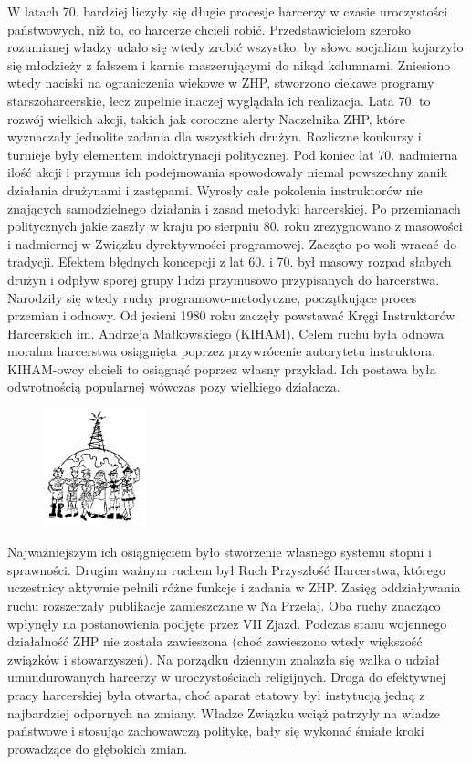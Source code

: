 W latach 70. bardziej liczyły się długie procesje harcerzy w czasie uroczystości państwowych, niż to, co harcerze chcieli robić. Przedstawicielom szeroko rozumianej władzy udało się wtedy zrobić wszystko, by słowo socjalizm kojarzyło się młodzieży z fałszem i karnie maszerującymi do nikąd kolumnami. Zniesiono wtedy naciski na ograniczenia wiekowe w ZHP, stworzono ciekawe programy starszoharcerskie, lecz zupełnie inaczej wyglądała ich realizacja. Lata 70. to rozwój wielkich akcji, takich jak coroczne alerty Naczelnika ZHP, które wyznaczały jednolite zadania dla wszystkich drużyn. Rozliczne konkursy i turnieje były elementem indoktrynacji politycznej. Pod koniec lat 70. nadmierna ilość akcji i przymus ich podejmowania spowodowały niemal powszechny zanik działania drużynami i zastępami. Wyrosły całe pokolenia instruktorów nie znających samodzielnego działania i zasad metodyki harcerskiej.
Po przemianach politycznych jakie zaszły w kraju po sierpniu 80. roku zrezygnowano z masowości i nadmiernej w Związku dyrektywności programowej. Zaczęto po woli wracać do tradycji. Efektem błędnych koncepcji z lat 60. i 70. był masowy rozpad słabych drużyn i odpływ sporej grupy ludzi przymusowo przypisanych do harcerstwa. 
Narodziły się wtedy ruchy programowo-metodyczne, początkujące proces przemian i odnowy. Od jesieni 1980 roku zaczęły powstawać Kręgi Instruktorów Harcerskich im. Andrzeja Małkowskiego (KIHAM). Celem ruchu była odnowa moralna harcerstwa osiągnięta poprzez przywrócenie autorytetu instruktora. KIHAM-owcy chcieli to osiągnąć poprzez własny przykład. Ich postawa była odwrotnością popularnej wówczas pozy wielkiego działacza. \begin{figure}
  \begin{center}
    \includegraphics[width=3cm]{grafiki/bts.png}
  \end{center}
\end{figure}Najważniejszym ich osiągnięciem było stworzenie własnego systemu stopni i sprawności. Drugim ważnym ruchem był Ruch Przyszłość Harcerstwa, którego uczestnicy aktywnie pełnili różne funkcje i zadania w ZHP. Zasięg oddziaływania ruchu rozszerzały publikacje zamieszczane w Na Przełaj. Oba ruchy znacząco wpłynęły na postanowienia podjęte przez VII Zjazd. Podczas stanu wojennego działalność ZHP nie została zawieszona (choć zawieszono wtedy większość związków i stowarzyszeń). Na porządku dziennym znalazła się walka o udział umundurowanych harcerzy w uroczystościach religijnych. Droga do efektywnej pracy harcerskiej była otwarta, choć aparat etatowy był instytucją jedną z najbardziej odpornych na zmiany. Władze Związku wciąż patrzyły na władze państwowe i stosując zachowawczą politykę, bały się wykonać śmiałe kroki prowadzące do głębokich zmian.

